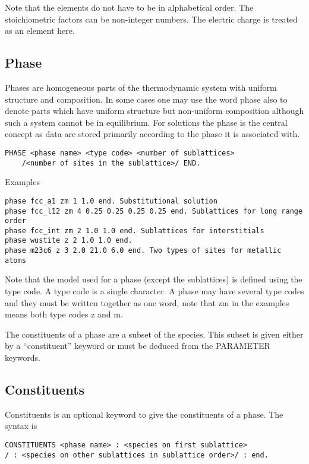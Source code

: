 \documentclass[12pt]{article}
\begin{document}
Note that the elements do not have to be in alphabetical order. The
stoichiometric factors can be non-integer numbers. The electric charge
is treated as an element here. 

\subsection{Phase}

Phases are homogeneous parts of the thermodynamic system with uniform
structure and composition. In some cases one may use the word phase
also to denote parts which have uniform structure but non-uniform
composition although such a system cannot be in equilibrium. For
solutions the phase is the central concept as data are stored
primarily according to the phase it is associated with.

\begin{verbatim}
PHASE <phase name> <type code> <number of sublattices>
    /<number of sites in the sublattice>/ END.
\end{verbatim}

Examples

\begin{verbatim}
phase fcc_a1 zm 1 1.0 end. Substitutional solution
phase fcc_l12 zm 4 0.25 0.25 0.25 0.25 end. Sublattices for long range order
phase fcc_int zm 2 1.0 1.0 end. Sublattices for interstitials
phase wustite z 2 1.0 1.0 end.
phase m23c6 z 3 2.0 21.0 6.0 end. Two types of sites for metallic atoms
\end{verbatim}

Note that the model used for a phase (except the sublattices) is
defined using the type code. A type code is a single character. A
phase may have several type codes and they must be written together as
one word, note that zm in the examples means both type codes z and m.

The constituents of a phase are a subset of the species. This subset
is given either by a ``constituent'' keyword or must be deduced from the
PARAMETER keywords.

\subsection{Constituents}

Constituents is an optional keyword to give the constituents of a
phase. The syntax is

\begin{verbatim}
CONSTITUENTS <phase name> : <species on first sublattice> 
/ : <species on other sublattices in sublattice order>/ : end.
\end{verbatim}
\end{document}
